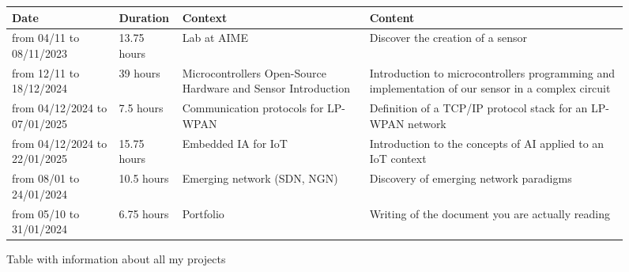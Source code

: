 \begin{figure}[H]
    \centering
    \begin{tabular}{|C{2cm}|C{2cm}|C{4cm}|C{6cm}|}
        \hline
        \textbf{Date} & \textbf{Duration} & \textbf{Context} & \textbf{Content} \\
        \hline
        from 04/11 to 08/11/2023 & 13.75 hours & Lab at AIME & Discover the creation of a sensor \\
        \hline
        from 12/11 to 18/12/2024 & 39 hours & Microcontrollers Open-Source Hardware and Sensor Introduction & Introduction to microcontrollers programming and implementation of our sensor in a complex circuit \\
        \hline
        from 04/12/2024 to 07/01/2025 & 7.5 hours & Communication protocols for LP-WPAN & Definition of a TCP/IP protocol stack for an LP-WPAN network \\
        \hline
        from 04/12/2024 to 22/01/2025 & 15.75 hours & Embedded IA for IoT & Introduction to the concepts of AI applied to an IoT context \\
        \hline
        from 08/01 to 24/01/2024 & 10.5 hours & Emerging network (SDN, NGN) & Discovery of emerging network paradigms \\
        \hline
        from 05/10 to 31/01/2024 & 6.75 hours & Portfolio & Writing of the document you are actually reading \\
        \hline
    \end{tabular}
    \caption{Table with information about all my projects}
\end{figure}
